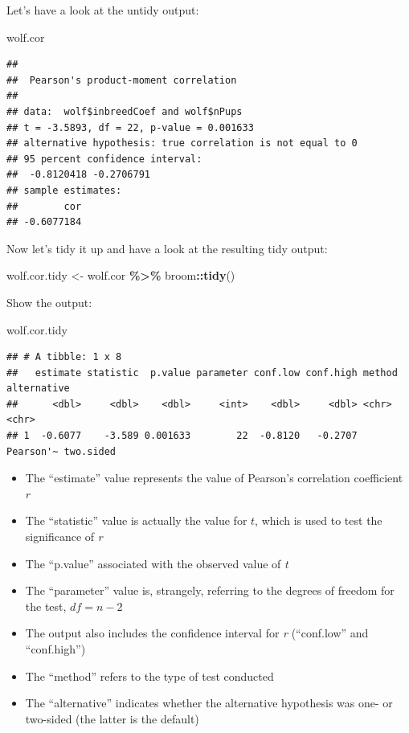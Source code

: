 \documentclass[
]{book}
\newenvironment{Shaded}{\begin{snugshade}}{\end{snugshade}}
\newcommand{\FunctionTok}[1]{\textcolor[rgb]{0.13,0.29,0.53}{\textbf{#1}}}
\newcommand{\NormalTok}[1]{#1}
\newcommand{\OtherTok}[1]{\textcolor[rgb]{0.56,0.35,0.01}{#1}}
\newcommand{\SpecialCharTok}[1]{\textcolor[rgb]{0.81,0.36,0.00}{\textbf{#1}}}
\providecommand{\tightlist}{%
  \setlength{\itemsep}{0pt}\setlength{\parskip}{0pt}}
\begin{document}
Let's have a look at the untidy output:

\begin{Shaded}
\begin{Highlighting}[]
\NormalTok{wolf.cor}
\end{Highlighting}
\end{Shaded}

\begin{verbatim}
## 
##  Pearson's product-moment correlation
## 
## data:  wolf$inbreedCoef and wolf$nPups
## t = -3.5893, df = 22, p-value = 0.001633
## alternative hypothesis: true correlation is not equal to 0
## 95 percent confidence interval:
##  -0.8120418 -0.2706791
## sample estimates:
##        cor 
## -0.6077184
\end{verbatim}

Now let's tidy it up and have a look at the resulting tidy output:

\begin{Shaded}
\begin{Highlighting}[]
\NormalTok{wolf.cor.tidy }\OtherTok{\textless{}{-}}\NormalTok{ wolf.cor }\SpecialCharTok{\%\textgreater{}\%}
\NormalTok{  broom}\SpecialCharTok{::}\FunctionTok{tidy}\NormalTok{()}
\end{Highlighting}
\end{Shaded}

Show the output:

\begin{Shaded}
\begin{Highlighting}[]
\NormalTok{wolf.cor.tidy}
\end{Highlighting}
\end{Shaded}

\begin{verbatim}
## # A tibble: 1 x 8
##   estimate statistic  p.value parameter conf.low conf.high method    alternative
##      <dbl>     <dbl>    <dbl>     <int>    <dbl>     <dbl> <chr>     <chr>      
## 1  -0.6077    -3.589 0.001633        22  -0.8120   -0.2707 Pearson'~ two.sided
\end{verbatim}

\begin{itemize}
\tightlist
\item
  The ``estimate'' value represents the value of Pearson's correlation coefficient \(r\)
\item
  The ``statistic'' value is actually the value for \(t\), which is used to test the significance of \emph{r}
\item
  The ``p.value'' associated with the observed value of \emph{t}
\item
  The ``parameter'' value is, strangely, referring to the degrees of freedom for the test, \(df = n - 2\)
\item
  The output also includes the confidence interval for \emph{r} (``conf.low'' and ``conf.high'')
\item
  The ``method'' refers to the type of test conducted
\item
  The ``alternative'' indicates whether the alternative hypothesis was one- or two-sided (the latter is the default)
\end{itemize}
\end{document}
